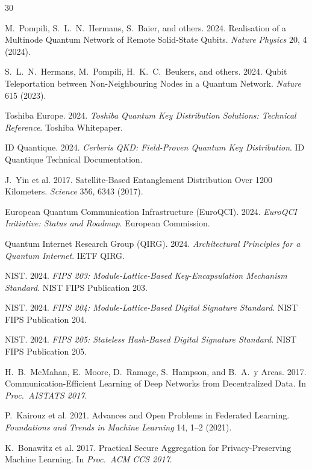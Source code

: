 \documentclass[sigconf,nonacm]{acmart}
\begin{document}
\sloppy

\begin{thebibliography}{30}

M.~Pompili, S.~L.~N.~Hermans, S.~Baier, and others. 2024.
Realisation of a Multinode Quantum Network of Remote Solid-State
Qubits. \textit{Nature Physics} 20, 4 (2024).

S.~L.~N.~Hermans, M.~Pompili, H.~K.~C.~Beukers, and others. 2024.
Qubit Teleportation between Non-Neighbouring Nodes in a Quantum
Network. \textit{Nature} 615 (2023).

Toshiba Europe. 2024. \textit{Toshiba Quantum Key Distribution
Solutions: Technical Reference}. Toshiba Whitepaper.

ID Quantique. 2024. \textit{Cerberis QKD: Field-Proven Quantum
Key Distribution}. ID Quantique Technical Documentation.

J.~Yin et al. 2017. Satellite-Based Entanglement Distribution
Over 1200 Kilometers. \textit{Science} 356, 6343 (2017).

European Quantum Communication Infrastructure (EuroQCI). 2024.
\textit{EuroQCI Initiative: Status and Roadmap}. European
Commission.

Quantum Internet Research Group (QIRG). 2024. \textit{Architectural
Principles for a Quantum Internet}. IETF QIRG.

NIST. 2024. \textit{FIPS 203: Module-Lattice-Based Key-Encapsulation
Mechanism Standard}. NIST FIPS Publication 203.

NIST. 2024. \textit{FIPS 204: Module-Lattice-Based Digital
Signature Standard}. NIST FIPS Publication 204.

NIST. 2024. \textit{FIPS 205: Stateless Hash-Based Digital
Signature Standard}. NIST FIPS Publication 205.

H.~B.~McMahan, E.~Moore, D.~Ramage, S.~Hampson, and B.~A.~y
Arcas. 2017. Communication-Efficient Learning of Deep Networks
from Decentralized Data. In \textit{Proc.\ AISTATS 2017}.

P.~Kairouz et al. 2021. Advances and Open Problems in Federated
Learning. \textit{Foundations and Trends in Machine Learning} 14,
1--2 (2021).

K.~Bonawitz et al. 2017. Practical Secure Aggregation for
Privacy-Preserving Machine Learning. In \textit{Proc.\ ACM CCS
2017}.


\end{thebibliography}
\end{document}

